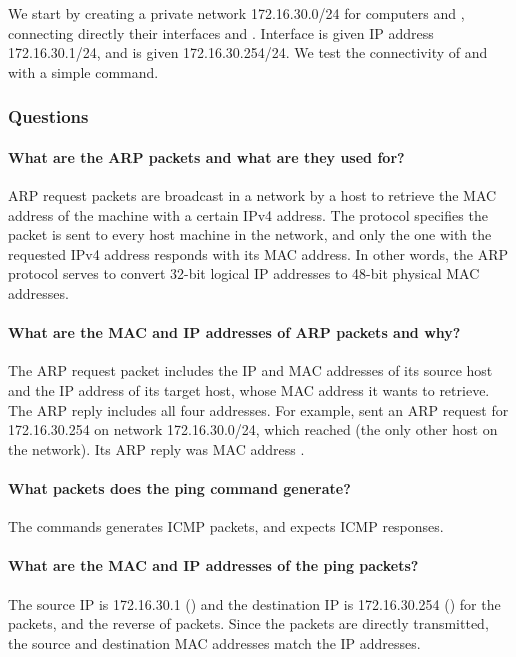 \documentclass[compilation.tex]{subfiles}
\begin{document}
	We start by creating a private network 172.16.30.0/24 for computers  and , connecting directly their interfaces  and . Interface  is given IP address 172.16.30.1/24, and  is given 172.16.30.254/24.
	We test the connectivity of  and  with a simple  command.
	
	\subsubsection{Questions}
	\label{subsubsec:exp1questions}
	
	\paragraph{What are the ARP packets and what are they used for?}
	ARP request packets are broadcast in a network by a host to retrieve the MAC address of the machine with a certain IPv4 address.
	The protocol specifies the packet is sent to every host machine in the network,
	and only the one with the requested IPv4 address responds with its MAC address.
	In other words, the ARP protocol serves to convert 32-bit logical IP addresses to 48-bit physical MAC addresses.
	
	\paragraph{What are the MAC and IP addresses of ARP packets and why?}
	The ARP request packet includes the IP and MAC addresses of its source host and the IP address of its target host, whose MAC address it wants to retrieve. The ARP reply includes all four addresses.
	For example,  sent an ARP request for 172.16.30.254 on network 172.16.30.0/24, which reached  (the only other host on the network). Its ARP reply was MAC address .
	
	\paragraph{What packets does the ping command generate?}
	The  commands generates ICMP  packets, and expects ICMP  responses.
	
	\paragraph{What are the MAC and IP addresses of the ping packets?}
	The source IP is 172.16.30.1 () and the destination IP is 172.16.30.254 () for the  packets, and the reverse of  packets.
	Since the packets are directly transmitted, the source and destination MAC addresses match the IP addresses.
	
\end{document}
